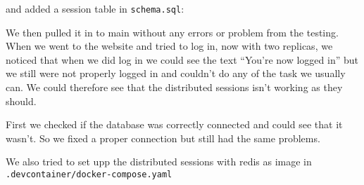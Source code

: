 and added a session table in \texttt{schema.sql}:


We then pulled it in to main without any errors or problem from the testing. When we went to the website and tried to log in, now with two replicas, we noticed that when we did log in we could see the text ``You're now logged in'' but we still were not properly logged in and couldn't do any of the task we usually can. We could therefore see that the distributed sessions isn't working as they should.

First we checked if the database was correctly connected and could see that it wasn't. So we fixed a proper connection but still had the same problems.

We also tried to set upp the distributed sessions with redis as image in \texttt{.devcontainer/docker-compose.yaml}



